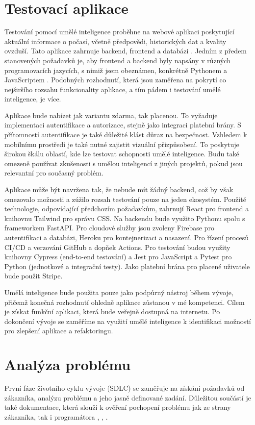 \documentclass[FM,DP]{tulthesis}
\begin{document}
		\section{Testovací aplikace}
		Testování pomocí umělé inteligence proběhne na webové aplikaci poskytující aktuální informace o počasí, včetně předpovědi, historických dat a kvality ovzduší. Tato aplikace zahrnuje backend, frontend a databázi \cite{webapp_basics}. Jedním z předem stanovených požadavků je, aby frontend a backend byly napsány v různých programovacích jazycích, s nimiž jsem obeznámen, konkrétně Pythonem \cite{python} a JavaScriptem \cite{nodejs}. Podobných rozhodnutí, která jsou zaměřena na pokrytí co nejširšího rozsahu funkcionality aplikace, a tím pádem i testování umělé inteligence, je více.
		
		Aplikace bude nabízet jak variantu zdarma, tak placenou. To vyžaduje implementaci autentifikace a autorizace, stejně jako integraci platební brány. S přítomností autentifikace je také důležité klást důraz na bezpečnost. Vzhledem k mobilnímu prostředí je také nutné zajistit vizuální přizpůsobení. To poskytuje širokou škálu oblastí, kde lze testovat schopnosti umělé inteligence. Budu také omezeně používat zkušenosti s umělou inteligencí z jiných projektů, pokud jsou relevantní pro současný problém.
		
		Aplikace může být navržena tak, že nebude mít žádný backend, což by však omezovalo možnosti a zúžilo rozsah testování pouze na jeden ekosystém. Použité technologie, odpovídající předchozím požadavkům, zahrnují React pro frontend a knihovnu Tailwind pro správu CSS. Na backendu bude využito Pythonu spolu s frameworkem FastAPI. Pro cloudové služby jsou zvoleny Firebase pro autentifikaci a databázi, Heroku pro kontejnerizaci a nasazení. Pro řízení procesů CI/CD a verzování GitHub a dopňek Actions. Pro testování budou využity knihovny Cypress (end-to-end testování) a Jest pro JavaScript a Pytest pro Python (jednotkové a integrační testy). Jako platební brána pro placené uživatele bude použit Stripe.
		
		Umělá inteligence bude použita pouze jako podpůrný nástroj během vývoje, přičemž konečná rozhodnutí ohledně aplikace zůstanou v mé kompetenci. Cílem je získat funkční aplikaci, která bude veřejně dostupná na internetu. Po dokončení vývoje se zaměříme na využití umělé inteligence k identifikaci možností pro zlepšení aplikace a refaktoringu.
		
		\section{Analýza problému}
		První fáze životního cyklu vývoje (SDLC) se zaměřuje na získání požadavků od zákazníka, analýzu problému a jeho jasně definované zadání. Důležitou součástí je také dokumentace, která slouží k ověření pochopení problému jak ze strany zákazníka, tak i programátora \cite{problem_analysis3}, \cite{software_analysis}, \cite{SWEBook}.
		
\end{document}
